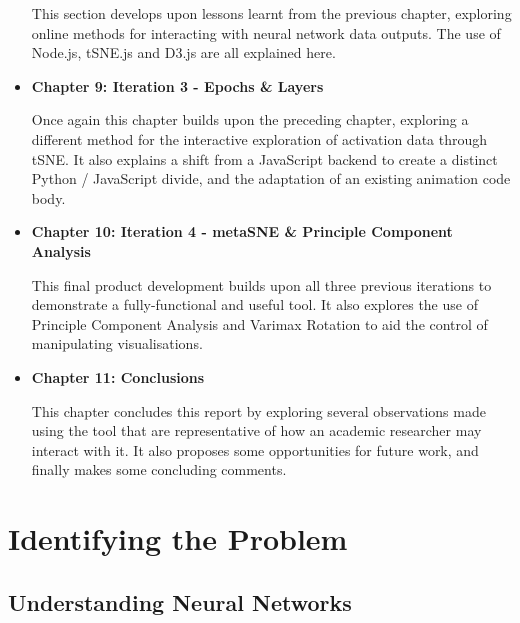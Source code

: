 \documentclass[a4paper,11pt,titlepage]{article}
\begin{document}
\begin{itemize}
	\par 
	This section develops upon lessons learnt from the previous chapter, exploring online methods for interacting with neural network data outputs. The use of Node.js, tSNE.js and D3.js are all explained here.
	\item \textbf{Chapter 9: Iteration 3 - Epochs \& Layers}
	\par 
	Once again this chapter builds upon the preceding chapter, exploring a different method for the interactive exploration of activation data through tSNE. It also explains a shift from a JavaScript backend to create a distinct Python / JavaScript divide, and the adaptation of an existing animation code body.
	\item \textbf{Chapter 10: Iteration 4 - metaSNE \& Principle Component Analysis}
	\par 
	This final product development builds upon all three previous iterations to demonstrate a fully-functional and useful tool. It also explores the use of Principle Component Analysis and Varimax Rotation to aid the control of manipulating visualisations.
	\item \textbf{Chapter 11: Conclusions}
	\par 
	This chapter concludes this report by exploring several observations made using the tool that are representative of how an academic researcher may interact with it. It also proposes some opportunities for future work, and finally makes some concluding comments.
	\end{itemize}
\clearpage

\section{Identifying the Problem}

	\subsection{Understanding Neural Networks}
		
\end{document}
